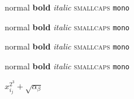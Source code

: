 \documentclass[11pt,a4paper]{article}
\begin{document}
{{\large normal} {\large \textbf{bold}} {\large \textit{italic}} {\large \textsc{smallcaps}} {\large \texttt{mono}}

{\Large normal} {\Large \textbf{bold}} {\Large \textit{italic}} {\Large \textsc{smallcaps}} {\Large \texttt{mono}}

{\LARGE normal} {\LARGE \textbf{bold}} {\LARGE \textit{italic}} {\LARGE \textsc{smallcaps}} {\LARGE \texttt{mono}}

{\huge normal} {\huge \textbf{bold}} {\huge \textit{italic}} {\huge \textsc{smallcaps}} {\huge \texttt{mono}}

$x_{i_{j}}^{2^{3}} + \sqrt{\alpha_\beta}$

}{}

\end{document}
